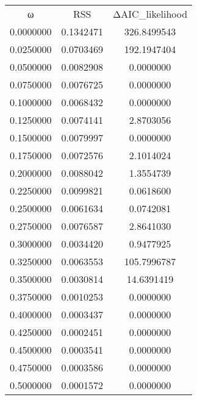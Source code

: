 \begin{tabular}{ccc}
ω & RSS & ΔAIC_likelihood\\
0.0000000 & 0.1342471 & 326.8499543\\
0.0250000 & 0.0703469 & 192.1947404\\
0.0500000 & 0.0082908 & 0.0000000\\
0.0750000 & 0.0076725 & 0.0000000\\
0.1000000 & 0.0068432 & 0.0000000\\
0.1250000 & 0.0074141 & 2.8703056\\
0.1500000 & 0.0079997 & 0.0000000\\
0.1750000 & 0.0072576 & 2.1014024\\
0.2000000 & 0.0088042 & 1.3554739\\
0.2250000 & 0.0099821 & 0.0618600\\
0.2500000 & 0.0061634 & 0.0742081\\
0.2750000 & 0.0076587 & 2.8641030\\
0.3000000 & 0.0034420 & 0.9477925\\
0.3250000 & 0.0063553 & 105.7996787\\
0.3500000 & 0.0030814 & 14.6391419\\
0.3750000 & 0.0010253 & 0.0000000\\
0.4000000 & 0.0003437 & 0.0000000\\
0.4250000 & 0.0002451 & 0.0000000\\
0.4500000 & 0.0003541 & 0.0000000\\
0.4750000 & 0.0003586 & 0.0000000\\
0.5000000 & 0.0001572 & 0.0000000\\
\end{tabular}

